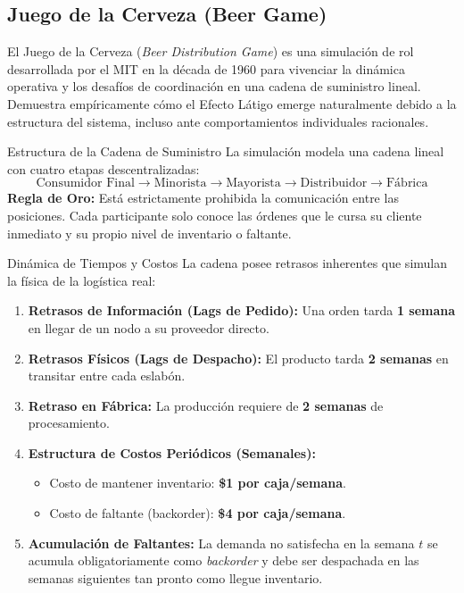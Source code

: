 \subsection[Juego de la Cerveza]{Juego de la Cerveza (Beer Game)}

El Juego de la Cerveza (\textit{Beer Distribution Game}) es una simulación de rol desarrollada por el MIT en la década de 1960 para vivenciar la dinámica operativa y los desafíos de coordinación en una cadena de suministro lineal. Demuestra empíricamente cómo el Efecto Látigo emerge naturalmente debido a la estructura del sistema, incluso ante comportamientos individuales racionales.

\begin{definicion}{Estructura de la Cadena de Suministro}
  La simulación modela una cadena lineal con cuatro etapas descentralizadas:
  \[
    \text{Consumidor Final} \longrightarrow \text{Minorista} \longrightarrow \text{Mayorista} \longrightarrow \text{Distribuidor} \longrightarrow \text{Fábrica}
  \]
  \textbf{Regla de Oro:} Está estrictamente prohibida la comunicación entre las posiciones. Cada participante solo conoce las órdenes que le cursa su cliente inmediato y su propio nivel de inventario o faltante.
\end{definicion}

\begin{formulas}{Dinámica de Tiempos y Costos}
  La cadena posee retrasos inherentes que simulan la física de la logística real:
  \begin{enumerate}[leftmargin=1.6em, itemsep=1pt]
    \item \textbf{Retrasos de Información (Lags de Pedido):} Una orden tarda \textbf{1 semana} en llegar de un nodo a su proveedor directo.
    \item \textbf{Retrasos Físicos (Lags de Despacho):} El producto tarda \textbf{2 semanas} en transitar entre cada eslabón.
    \item \textbf{Retraso en Fábrica:} La producción requiere de \textbf{2 semanas} de procesamiento.
    \item \textbf{Estructura de Costos Periódicos (Semanales):}
      \begin{itemize}[leftmargin=1.2em, itemsep=1pt]
        \item Costo de mantener inventario: \textbf{\$1 por caja/semana}.
        \item Costo de faltante (backorder): \textbf{\$4 por caja/semana}.
      \end{itemize}
    \item \textbf{Acumulación de Faltantes:} La demanda no satisfecha en la semana $t$ se acumula obligatoriamente como \textit{backorder} y debe ser despachada en las semanas siguientes tan pronto como llegue inventario.
  \end{enumerate}
\end{formulas}

